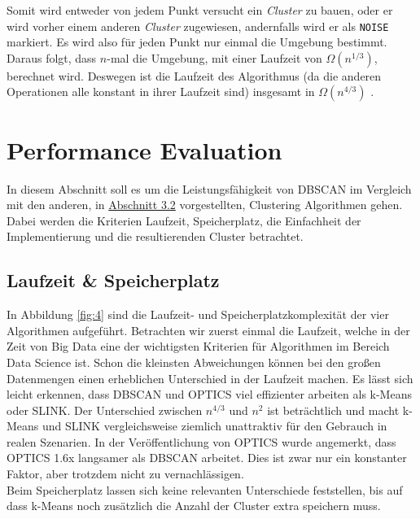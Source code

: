 \documentclass{lni}
\begin{document}

Somit wird entweder von jedem Punkt versucht ein \textit{Cluster} zu bauen, oder er wird vorher einem anderen \textit{Cluster} zugewiesen, andernfalls wird er als \lstinline{NOISE} markiert. Es wird also für jeden Punkt nur einmal die Umgebung bestimmt. Daraus folgt, dass $n$-mal die Umgebung, mit einer Laufzeit von $\Omega(n^{1/3})$, berechnet wird. Deswegen ist die Laufzeit des Algorithmus (da die anderen Operationen alle konstant in ihrer Laufzeit sind) insgesamt in $\Omega(n^{4/3})$ \cite{REV}. 

%
%

\newpage

\section{Performance Evaluation}
\label{sec:perf}
In diesem Abschnitt soll es um die Leistungsfähigkeit von DBSCAN im Vergleich mit den anderen, in \hyperref[sec:abstand]{Abschnitt 3.2} vorgestellten, Clustering Algorithmen gehen. Dabei werden die Kriterien Laufzeit, Speicherplatz, die Einfachheit der Implementierung und die resultierenden Cluster betrachtet.


\subsection{Laufzeit \& Speicherplatz}

In Abbildung \ref{fig:4} sind die Laufzeit- und Speicherplatzkomplexität der vier Algorithmen aufgeführt. Betrachten wir zuerst einmal die Laufzeit, welche in der Zeit von Big Data eine der wichtigsten Kriterien für Algorithmen im Bereich Data Science ist. Schon die kleinsten Abweichungen können bei den großen Datenmengen einen erheblichen Unterschied in der Laufzeit machen.
Es lässt sich leicht erkennen, dass DBSCAN und OPTICS viel effizienter arbeiten als k-Means oder SLINK. Der Unterschied zwischen $n^{4/3}$ \cite{REV} \cite{REVREV} und $n^2$ ist beträchtlich und macht k-Means und SLINK vergleichsweise ziemlich unattraktiv für den Gebrauch in realen Szenarien. In der Veröffentlichung von OPTICS \cite{OPTICS} wurde angemerkt, dass OPTICS 1.6x langsamer als DBSCAN arbeitet. Dies ist zwar nur ein konstanter Faktor, aber trotzdem nicht zu vernachlässigen.\\
Beim Speicherplatz lassen sich keine relevanten Unterschiede feststellen, bis auf dass k-Means noch zusätzlich die Anzahl der Cluster extra speichern muss.\\
\end{document}
